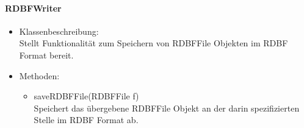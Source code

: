 \documentclass[parskip=full]{scrartcl}
\begin{document}
\paragraph{RDBFWriter}
\begin{itemize}
\item Klassenbeschreibung: \\
Stellt Funktionalität zum Speichern von RDBFFile Objekten im RDBF Format bereit.
\item Methoden: \\
\begin{itemize}
\item saveRDBFFile(RDBFFile f) \\
Speichert das übergebene RDBFFile Objekt an der darin spezifizierten Stelle im RDBF Format ab.
\end{itemize}
\end{itemize}
\end{document}

